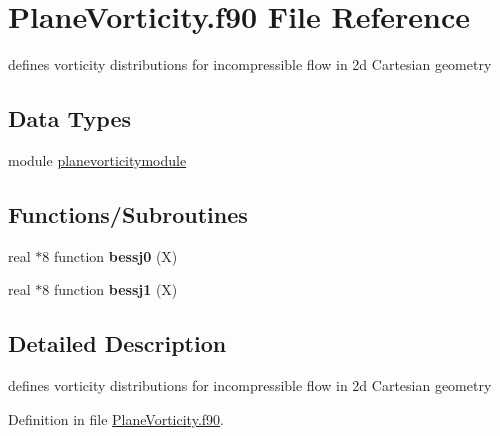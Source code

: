 \hypertarget{_plane_vorticity_8f90}{\section{Plane\+Vorticity.\+f90 File Reference}
\label{_plane_vorticity_8f90}
}


defines vorticity distributions for incompressible flow in 2d Cartesian geometry  


\subsection*{Data Types}
\begin{DoxyCompactItemize}
\item 
module \hyperlink{classplanevorticitymodule}{planevorticitymodule}
\end{DoxyCompactItemize}
\subsection*{Functions/\+Subroutines}
\begin{DoxyCompactItemize}
\item 
\hypertarget{_plane_vorticity_8f90_a70831e8e544a234d3dfbf5d7387626ef}{real $\ast$8 function {\bfseries bessj0} (X)}\label{_plane_vorticity_8f90_a70831e8e544a234d3dfbf5d7387626ef}

\item 
\hypertarget{_plane_vorticity_8f90_a2aef5eab222a588450d9931334f31a95}{real $\ast$8 function {\bfseries bessj1} (X)}\label{_plane_vorticity_8f90_a2aef5eab222a588450d9931334f31a95}

\end{DoxyCompactItemize}


\subsection{Detailed Description}
defines vorticity distributions for incompressible flow in 2d Cartesian geometry 



Definition in file \hyperlink{_plane_vorticity_8f90_source}{Plane\+Vorticity.\+f90}.


